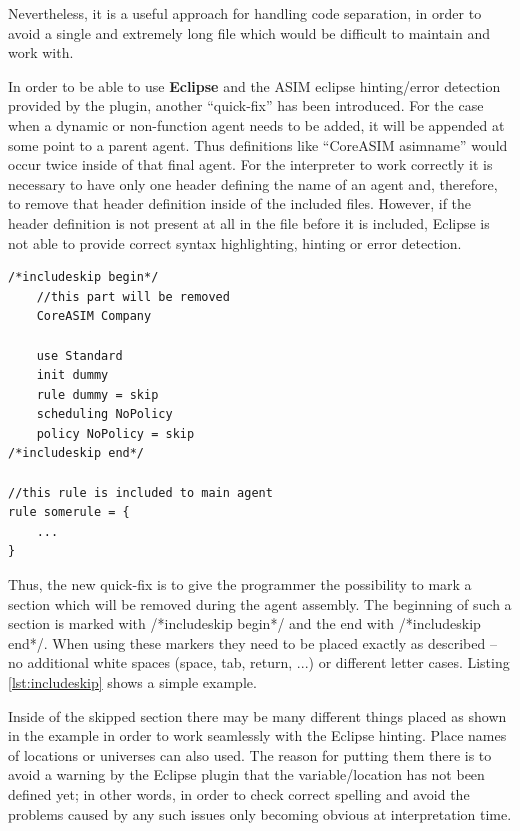 Nevertheless, it is a useful approach for handling code separation, in order to avoid a single and extremely long file which would be difficult to maintain and work with.

In order to be able to use \textbf{Eclipse} and the ASIM eclipse hinting/error detection provided by the plugin, another ``quick-fix'' has been introduced. For the case when a dynamic or non-function agent needs to be added, it will be appended at some point to a parent agent. Thus definitions like ``CoreASIM asimname'' would occur twice inside of that final agent. For the interpreter to work correctly it is necessary to have only one header defining the name of an agent and, therefore, to remove that header definition inside of the included files. However, if the header definition is not present at all in the file before it is included, Eclipse is not able to provide correct syntax highlighting, hinting or error detection.

\begin{center}
\begin{minipage}{0.8\textwidth}
\small
\begin{lstlisting}[language=bsl_lst,caption={\bf\small includeskip usage},label=lst:includeskip]
/*includeskip begin*/
	//this part will be removed
	CoreASIM Company

	use Standard 
	init dummy
	rule dummy = skip
	scheduling NoPolicy
	policy NoPolicy = skip
/*includeskip end*/

//this rule is included to main agent
rule somerule = {
	...
}
\end{lstlisting}
\end{minipage}
\end{center}

Thus, the new quick-fix is to give the programmer the possibility to mark a section which will be removed during the agent assembly. The beginning of such a section is marked with \textcolor{eclipseComment}{/*includeskip begin*/} and the end with \textcolor{eclipseComment}{/*includeskip end*/}. When using these markers they need to be placed exactly as described -- no additional white spaces (space, tab, return, ...) or different letter cases. Listing \ref{lst:includeskip} shows a simple example.

Inside of the skipped section there may be many different things placed as shown in the example in order to work seamlessly with the Eclipse hinting. Place names of locations or universes can also used. The reason for putting them there is to avoid a warning by the Eclipse plugin that the variable/location has not been defined yet; in other words, in order to check correct spelling and avoid the problems caused by any such issues only becoming obvious at interpretation time.


